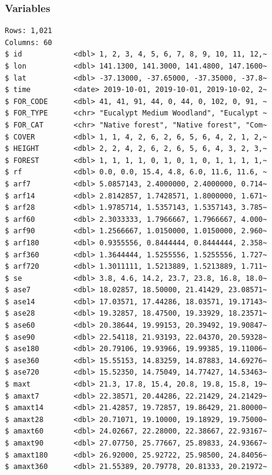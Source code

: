 \documentclass[
  letterpaper,
]{krantz}
\begin{document}
\subsubsection*{Variables}\label{variables-1}

\begin{verbatim}
Rows: 1,021
Columns: 60
$ id            <dbl> 1, 2, 3, 4, 5, 6, 7, 8, 9, 10, 11, 12,~
$ lon           <dbl> 141.1300, 141.3000, 141.4800, 147.1600~
$ lat           <dbl> -37.13000, -37.65000, -37.35000, -37.8~
$ time          <date> 2019-10-01, 2019-10-01, 2019-10-02, 2~
$ FOR_CODE      <dbl> 41, 41, 91, 44, 0, 44, 0, 102, 0, 91, ~
$ FOR_TYPE      <chr> "Eucalypt Medium Woodland", "Eucalypt ~
$ FOR_CAT       <chr> "Native forest", "Native forest", "Com~
$ COVER         <dbl> 1, 1, 4, 2, 6, 2, 6, 5, 6, 4, 2, 1, 2,~
$ HEIGHT        <dbl> 2, 2, 4, 2, 6, 2, 6, 5, 6, 4, 3, 2, 3,~
$ FOREST        <dbl> 1, 1, 1, 1, 0, 1, 0, 1, 0, 1, 1, 1, 1,~
$ rf            <dbl> 0.0, 0.0, 15.4, 4.8, 6.0, 11.6, 11.6, ~
$ arf7          <dbl> 5.0857143, 2.4000000, 2.4000000, 0.714~
$ arf14         <dbl> 2.8142857, 1.7428571, 1.8000000, 1.671~
$ arf28         <dbl> 1.9785714, 1.5357143, 1.5357143, 3.785~
$ arf60         <dbl> 2.3033333, 1.7966667, 1.7966667, 4.000~
$ arf90         <dbl> 1.2566667, 1.0150000, 1.0150000, 2.960~
$ arf180        <dbl> 0.9355556, 0.8444444, 0.8444444, 2.358~
$ arf360        <dbl> 1.3644444, 1.5255556, 1.5255556, 1.727~
$ arf720        <dbl> 1.3011111, 1.5213889, 1.5213889, 1.711~
$ se            <dbl> 3.8, 4.6, 14.2, 23.7, 23.8, 16.8, 18.0~
$ ase7          <dbl> 18.02857, 18.50000, 21.41429, 23.08571~
$ ase14         <dbl> 17.03571, 17.44286, 18.03571, 19.17143~
$ ase28         <dbl> 19.32857, 18.47500, 19.33929, 18.23571~
$ ase60         <dbl> 20.38644, 19.99153, 20.39492, 19.90847~
$ ase90         <dbl> 22.54118, 21.93193, 22.04370, 20.59328~
$ ase180        <dbl> 20.79106, 19.93966, 19.99385, 19.11006~
$ ase360        <dbl> 15.55153, 14.83259, 14.87883, 14.69276~
$ ase720        <dbl> 15.52350, 14.75049, 14.77427, 14.53463~
$ maxt          <dbl> 21.3, 17.8, 15.4, 20.8, 19.8, 15.8, 19~
$ amaxt7        <dbl> 22.38571, 20.44286, 22.21429, 24.21429~
$ amaxt14       <dbl> 21.42857, 19.72857, 19.86429, 21.80000~
$ amaxt28       <dbl> 20.71071, 19.10000, 19.18929, 19.75000~
$ amaxt60       <dbl> 24.02667, 22.28000, 22.38667, 22.93167~
$ amaxt90       <dbl> 27.07750, 25.77667, 25.89833, 24.93667~
$ amaxt180      <dbl> 26.92000, 25.92722, 25.98500, 24.84056~
$ amaxt360      <dbl> 21.55389, 20.79778, 20.81333, 20.21972~

\end{verbatim}
\end{document}
